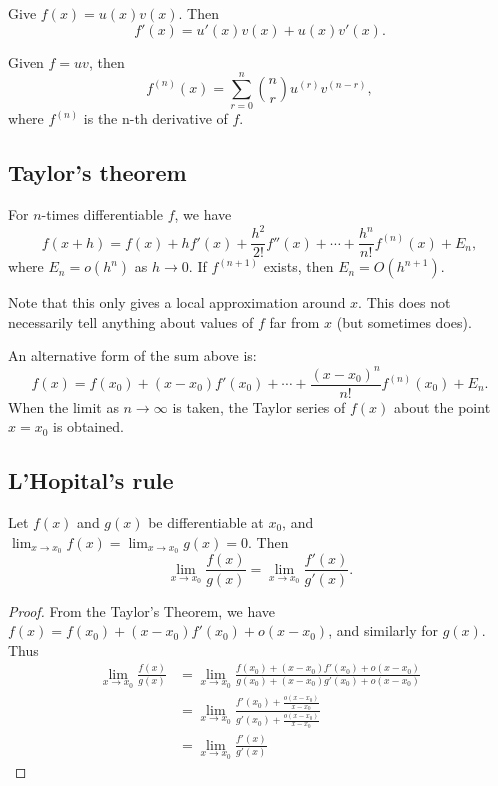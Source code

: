 \documentclass[a4paper]{article}
\begin{document}
\begin{thm}
  Give $f(x) = u(x)v(x)$. Then
  \[
    f'(x) = u'(x)v(x) + u(x)v'(x).
  \]
\end{thm}

\begin{thm}
  Given $f = uv$, then
  \[
    f^{(n)}(x) = \sum_{r = 0}^n \binom{n}{r}u^{(r)}v^{(n - r)},
  \]
  where $f^{(n)}$ is the n-th derivative of $f$.
\end{thm}

\subsection{Taylor's theorem}
\begin{thm}
  For $n$-times differentiable $f$, we have
  \[
    f(x + h) = f(x) + hf'(x) + \frac{h^2}{2!}f''(x) + \cdots + \frac{h^n}{n!}f^{(n)}(x) + E_n,
  \]
  where $E_n = o(h^{n})$ as $h\to 0$. If $f^{(n+1)}$ exists, then $E_n = O(h^{n+1})$.
\end{thm}
Note that this only gives a local approximation around $x$. This does not necessarily tell anything about values of $f$ far from $x$ (but sometimes does).

An alternative form of the sum above is:
\[
  f(x) = f(x_0) + (x-x_0)f'(x_0) + \cdots + \frac{(x-x_0)^n}{n!}f^{(n)}(x_0) + E_n.
\]
When the limit as $n\to \infty$ is taken, the Taylor series of $f(x)$ about the point $x = x_0$ is obtained.

\subsection{L'Hopital's rule}
\begin{thm}
  Let $f(x)$ and $g(x)$ be differentiable at $x_0$, and $\displaystyle \lim_{x\to x_0}f(x) = \lim_{x\to x_0}g(x) = 0$. Then
  \[
    \lim_{x\to x_0} \frac{f(x)}{g(x)} = \lim_{x\to x_0} \frac{f'(x)}{g'(x)}.
  \]
\end{thm}
\begin{proof}
  From the Taylor's Theorem, we have $f(x) = f(x_0) + (x - x_0)f'(x_0) + o(x - x_0)$, and similarly for $g(x)$. Thus
  \begin{align*}
    \lim_{x\to x_0} \frac{f(x)}{g(x)} &= \lim_{x\to x_0} \frac{f(x_0) + (x - x_0)f'(x_0) + o(x - x_0)}{g(x_0) + (x - x_0)g'(x_0) + o(x - x_0)}\\
    &= \lim_{x\to x_0} \frac{f'(x_0) + \frac{o(x-x_0)}{x-x_0}}{g'(x_0) + \frac{o(x-x_0)}{x-x_0}}\\
    &= \lim_{x\to x_0} \frac{f'(x)}{g'(x)}
  \end{align*}
\end{proof}
\end{document}

